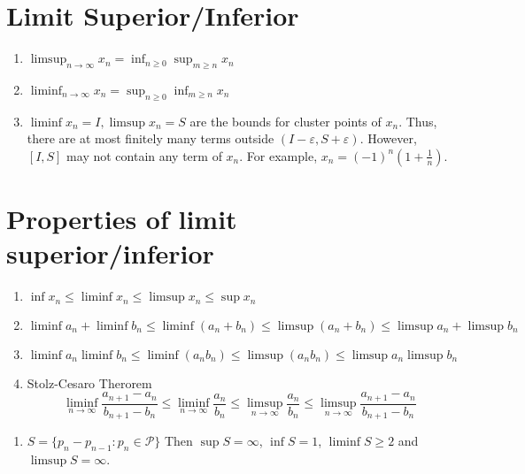 \section{Limit Superior/Inferior}
\begin{enumerate}
	\item $\displaystyle \limsup_{n \to \infty} x_n = \inf_{n \ge 0} \sup_{m \ge n} x_n $
	\item $ \displaystyle \liminf_{n \to \infty} x_n = \sup_{n \ge 0} \inf_{m \ge n} x_n $
	\item $\liminf x_n  = I,\limsup x_n = S$ are the bounds for cluster points of $x_n$.
	Thus, there are at most finitely many terms outside $(I-\varepsilon,S+\varepsilon)$.
	However, $[I,S]$ may not contain any term of $x_n$.
	For example, $x_n = (-1)^n (1+\frac{1}{n})$.
\end{enumerate}

\section{Properties of limit superior/inferior}
\begin{enumerate}
	\item $\inf x_n \le \liminf x_n \le \limsup x_n \le \sup x_n $
	\item $ \liminf a_n + \liminf b_n \le \liminf (a_n+b_n) \le \limsup (a_n + b_n) \le \limsup a_n + \limsup b_n $ 
	\item $ \liminf a_n \liminf b_n \le \liminf (a_n b_n) \le \limsup (a_n b_n) \le \limsup a_n \limsup b_n  $
	\item Stolz-Cesaro Therorem
		\[ \liminf_{n \to \infty} \frac{a_{n+1}-a_n}{b_{n+1}-b_n} \le \liminf_{n \to \infty} \frac{a_n}{b_n} \le \limsup_{n \to \infty} \frac{a_n}{b_n} \le \limsup_{n \to \infty} \frac{a_{n+1}-a_n}{b_{n+1}-b_n} \]
\end{enumerate}

\begin{enumerate}
	\item $S = \{ p_n - p_{n-1} : p_n \in \mathscr{P} \}$ Then $\sup S = \infty$, $\inf S = 1$, $\liminf S \ge 2$ and $\limsup S = \infty$.
\end{enumerate}


